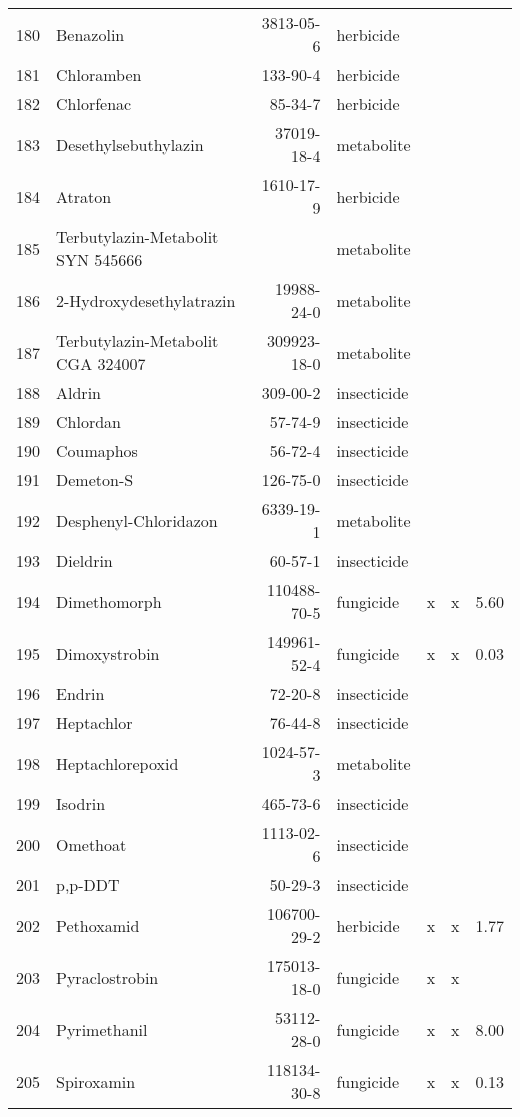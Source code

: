 \begin{longtable}{lp{3cm}rlp{0.5cm}p{0.5cm}p{1cm}}
  180 & Benazolin & 3813-05-6 & herbicide &  &  &  \\ 
  181 & Chloramben & 133-90-4 & herbicide &  &  &  \\ 
  182 & Chlorfenac & 85-34-7 & herbicide &  &  &  \\ 
  183 & Desethylsebuthylazin & 37019-18-4 & metabolite &  &  &  \\ 
  184 & Atraton & 1610-17-9 & herbicide &  &  &  \\ 
  185 & Terbutylazin-Metabolit SYN 545666 &  & metabolite &  &  &  \\ 
  186 & 2-Hydroxydesethylatrazin & 19988-24-0 & metabolite &  &  &  \\ 
  187 & Terbutylazin-Metabolit CGA 324007 & 309923-18-0 & metabolite &  &  &  \\ 
  188 & Aldrin & 309-00-2 & insecticide &  &  &  \\ 
  189 & Chlordan & 57-74-9 & insecticide &  &  &  \\ 
  190 & Coumaphos & 56-72-4 & insecticide &  &  &  \\ 
  191 & Demeton-S & 126-75-0 & insecticide &  &  &  \\ 
  192 & Desphenyl-Chloridazon & 6339-19-1 & metabolite &  &  &  \\ 
  193 & Dieldrin & 60-57-1 & insecticide &  &  &  \\ 
  194 & Dimethomorph & 110488-70-5 & fungicide & x & x & 5.60 \\ 
  195 & Dimoxystrobin & 149961-52-4 & fungicide & x & x & 0.03 \\ 
  196 & Endrin & 72-20-8 & insecticide &  &  &  \\ 
  197 & Heptachlor & 76-44-8 & insecticide &  &  &  \\ 
  198 & Heptachlorepoxid & 1024-57-3 & metabolite &  &  &  \\ 
  199 & Isodrin & 465-73-6 & insecticide &  &  &  \\ 
  200 & Omethoat & 1113-02-6 & insecticide &  &  &  \\ 
  201 & p,p-DDT & 50-29-3 & insecticide &  &  &  \\ 
  202 & Pethoxamid & 106700-29-2 & herbicide & x & x & 1.77 \\ 
  203 & Pyraclostrobin & 175013-18-0 & fungicide & x & x &  \\ 
  204 & Pyrimethanil & 53112-28-0 & fungicide & x & x & 8.00 \\ 
  205 & Spiroxamin & 118134-30-8 & fungicide & x & x & 0.13 \\ 

\end{longtable}
